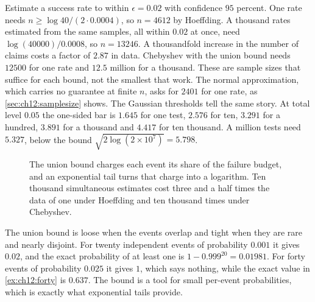 \begin{example}\label{ex:ch12:thousand}
Estimate a success rate to within $\epsilon=0.02$ with confidence $95$ percent. One rate needs $n\ge\log40/(2\cdot0.0004)$, so $n=4612$ by Hoeffding. A thousand rates estimated from the same samples, all within $0.02$ at once, need $\log(40000)/0.0008$, so $n=13246$. A thousandfold increase in the number of claims costs a factor of $2.87$ in data. Chebyshev with the union bound needs $12500$ for one rate and $12.5$ million for a thousand. These are sample sizes that suffice for each bound, not the smallest that work. The normal approximation, which carries no guarantee at finite $n$, asks for $2401$ for one rate, as \cref{sec:ch12:samplesize} shows. The Gaussian thresholds tell the same story. At total level $0.05$ the one-sided bar is $1.645$ for one test, $2.576$ for ten, $3.291$ for a hundred, $3.891$ for a thousand and $4.417$ for ten thousand. A million tests need $5.327$, below the bound $\sqrt{2\log(2\times10^7)}=5.798$.
\end{example}

\begin{figure}[tbp]
\centering
{}
\caption{The union bound charges each event its share of the failure budget, and an exponential tail turns that charge into a logarithm. Ten thousand simultaneous estimates cost three and a half times the data of one under Hoeffding and ten thousand times under Chebyshev.}
\label{fig:ch12:union}
\end{figure}

The union bound is loose when the events overlap and tight when they are rare and nearly disjoint. For twenty independent events of probability $0.001$ it gives $0.02$, and the exact probability of at least one is $1-0.999^{20}=0.01981$. For forty events of probability $0.025$ it gives $1$, which says nothing, while the exact value in \cref{ex:ch12:forty} is $0.637$. The bound is a tool for small per-event probabilities, which is exactly what exponential tails provide.

